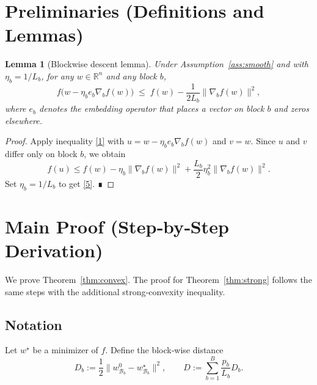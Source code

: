 \documentclass[11pt]{article}
\newtheorem{lemma}{Lemma}
\newcommand{\R}{\mathbb{R}}
\begin{document}
\section*{Preliminaries (Definitions and Lemmas)}
\begin{lemma}[Blockwise descent lemma]\label{lem:descent}
Under Assumption~\ref{ass:smooth} and with $\eta_{b}=1/L_{b}$,
for any $w\in\R^{n}$ and any block $b$,
\[
f\!\bigl(w-\eta_{b}e_{b}\nabla_{b}f(w)\bigr)
\;\le\;
f(w)-\frac{1}{2L_{b}}\|\nabla_{b}f(w)\|^{2},
\tag{5}
\]
where $e_{b}$ denotes the embedding operator that places a vector on block $b$
and zeros elsewhere.
\end{lemma}
\begin{proof}
Apply inequality \eqref{1} with $u=w-\eta_{b}e_{b}\nabla_{b}f(w)$ and $v=w$.
Since $u$ and $v$ differ only on block $b$, we obtain
\[
f(u)\le f(w)-\eta_{b}\|\nabla_{b}f(w)\|^{2}
+\frac{L_{b}}{2}\eta_{b}^{2}\|\nabla_{b}f(w)\|^{2}.
\]
Set $\eta_{b}=1/L_{b}$ to get \eqref{5}.  ∎
\end{proof}

\section*{Main Proof (Step‑by‑Step Derivation)}
We prove Theorem~\ref{thm:convex}.  The proof for Theorem~\ref{thm:strong}
follows the same steps with the additional strong‑convexity inequality.

\subsection*{Notation}
Let $w^{\star}$ be a minimizer of $f$.  Define the block‑wise distance
\[
D_{b}:=\frac12\|w^{0}_{\mathcal{B}_{b}}-w^{\star}_{\mathcal{B}_{b}}\|^{2},\qquad
D:=\sum_{b=1}^{B}\frac{p_{b}}{L_{b}}D_{b}.
\]
\end{document}
